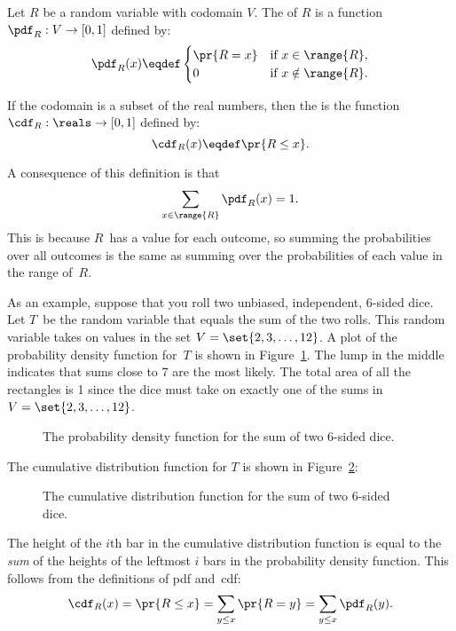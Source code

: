 \begin{definition}
Let $R$ be a random variable with codomain $V$.
The  of $R$
is a function $\pdf_R : V \to [0,1]$ defined by:
%
\[
\pdf_R(x) \eqdef \begin{cases}
            \pr{R = x} & \text{if } x \in \range{R},\\
             0 & \text{if } x \notin \range{R}.
           \end{cases}
\]

If the codomain is a subset of the real numbers, then the  is the function $\cdf_R : \reals \to [0, 1]$ defined by:
%
\[
\cdf_R(x) \eqdef \pr{R \leq x}.
\]
\end{definition}
%
A consequence of this definition is that
%
\[
\sum_{x \in \range{R}} \pdf_R(x) = 1.
\]
This is because $R$~has a value for each outcome, so summing the
probabilities over all outcomes is the same as summing over the
probabilities of each value in the range of~$R$.

As an example, suppose that you roll two unbiased, independent,
6-sided dice.  Let $T$~be the random variable that equals the sum of
the two rolls.  This random variable takes on values in the set $V =
\set{2, 3, \dots, 12}$.  A plot of the probability density function
for~$T$ is shown in Figure~\ref{fig:16F2}.  The lump in the middle
indicates that sums close to 7 are the most likely.  The total area of
all the rectangles is 1 since the dice must take on exactly one of the
sums in $V = \set{2, 3, \dots, 12}$.

\begin{figure}


\caption{The probability density function for the sum of two 6-sided
  dice.}

\label{fig:16F2}

\end{figure}

The cumulative distribution function for $T$ is shown in
Figure~\ref{fig:16F3}:
%
\begin{figure}


\caption{The cumulative distribution function for the sum of two
  6-sided dice.}

\label{fig:16F3}

\end{figure}
%
The height of the $i$th bar in the cumulative distribution function
is equal to the \emph{sum} of the heights of the leftmost $i$ bars
in the probability density function.  This follows from the
definitions of pdf and~cdf:
\[
\cdf_R(x)  = \pr{R \leq x}
           = \sum_{y \leq x} \pr{R = y}
           = \sum_{y \leq x} \pdf_R(y).
\]

